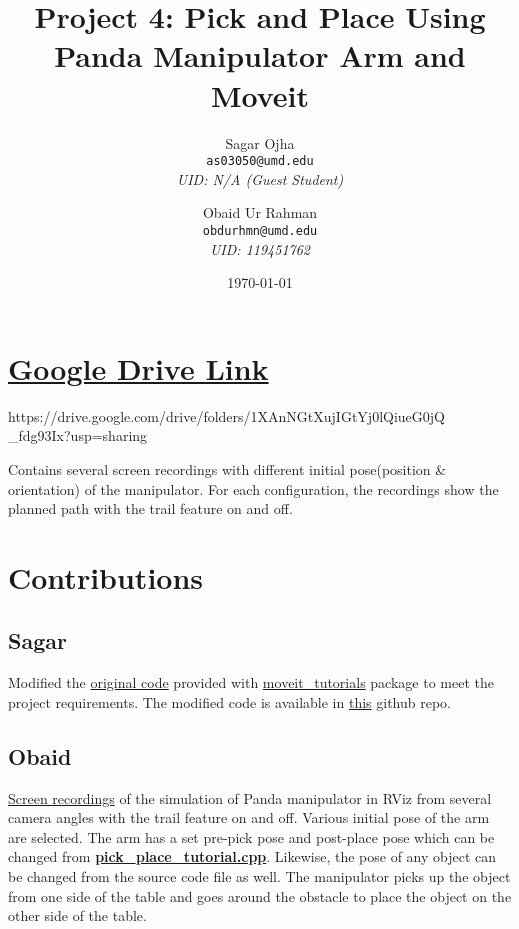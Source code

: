\documentclass[12pt]{extarticle}
\title{Project 4: Pick and Place Using Panda Manipulator Arm and Moveit}
\author{
	Sagar Ojha \\
	\texttt{as03050@umd.edu}\\
	\textit{UID: N/A (Guest Student)}
	\and
	Obaid Ur Rahman\\
	\texttt{obdurhmn@umd.edu}\\
	\textit{UID: 119451762}}
\date{\today}
\begin{document}
\maketitle
\newpage
\section{\href{https://drive.google.com/drive/folders/1XAnNGtXujIGtYj0lQiueG0jQ_fdg93Ix?usp=sharing}{Google Drive Link}}
\hspace{\parindent} https://drive.google.com/drive/folders/1XAnNGtXujIGtYj0lQiueG0jQ
\_fdg93Ix?usp=sharing

Contains several screen recordings with different initial pose(position \& orientation) of the manipulator. For each configuration, the recordings show the planned path with the trail feature on and off.

\section{Contributions}
\subsection{Sagar}
\hspace{\parindent} Modified the \href{https://github.com/ros-planning/moveit_tutorials/blob/master/doc/pick_place/src/pick_place_tutorial.cpp}{original code} provided with \href{https://ros-planning.github.io/moveit_tutorials/doc/getting_started/getting_started.html}{moveit\_tutorials} package to meet the project requirements. The modified code is available in \href{https://github.com/Sagar-Ojha/ENPM-661/tree/main/Project4}{this} github repo.

\subsection{Obaid}
\hspace{\parindent} \href{https://drive.google.com/drive/folders/1XAnNGtXujIGtYj0lQiueG0jQ_fdg93Ix?usp=sharing}{Screen recordings} of the simulation of Panda manipulator in RViz from several camera angles with the trail feature on and off. Various initial pose of the arm are selected. The arm has a set pre-pick pose and post-place pose which can be changed from \href{https://github.com/Sagar-Ojha/ENPM-661/tree/main/Project4}{\textbf{pick\_place\_tutorial.cpp}}. Likewise, the pose of any object can be changed from the source code file as well. The manipulator picks up the object from one side of the table and goes around the obstacle to place the object on the other side of the table.
\end{document}

